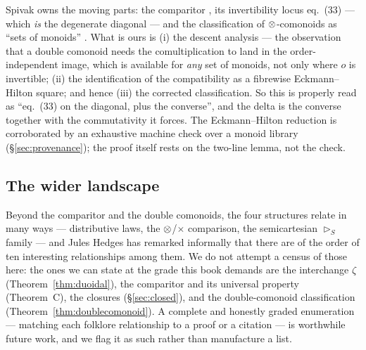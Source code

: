 \begin{Remark}\label{rem:nogohonest}
Spivak owns the moving parts: the comparitor \cite[eq.~(32)]{SpivakRef}, its
invertibility locus eq.~(33) --- which \emph{is} the degenerate diagonal --- and
the classification of $\mathbin{\otimes}$-comonoids as ``sets of monoids''
\cite{SpivakRef}. What is ours is (i) the descent analysis --- the observation
that a double comonoid needs the comultiplication to land in the
order-independent image, which is available for \emph{any} set of monoids, not
only where $o$ is invertible; (ii) the identification of the compatibility as a
fibrewise Eckmann--Hilton square; and hence (iii) the corrected classification.
So this is properly read as ``eq.~(33) on the diagonal, plus the converse'', and
the delta is the converse together with the commutativity it forces. The
Eckmann--Hilton reduction is corroborated by an exhaustive machine check over a
monoid library (§\ref{sec:provenance}); the proof itself rests on the two-line
lemma, not the check.
\end{Remark}

\subsection{The wider landscape}

Beyond the comparitor and the double comonoids, the four structures relate in
many ways --- distributive laws, the $\mathbin{\otimes}$/$\times$ comparison, the semicartesian
$\rhd_S$ family --- and Jules Hedges has remarked informally that there are of the
order of ten interesting relationships among them. We do not attempt a census of
those here: the ones we can state at the grade this book demands are the
interchange $\zeta$ (Theorem~\ref{thm:duoidal}), the comparitor and its universal
property (Theorem~C), the closures (§\ref{sec:closed}), and the double-comonoid
classification (Theorem~\ref{thm:doublecomonoid}). A complete and honestly graded
enumeration --- matching each folklore relationship to a proof or a citation --- is
worthwhile future work, and we flag it as such rather than manufacture a list.

